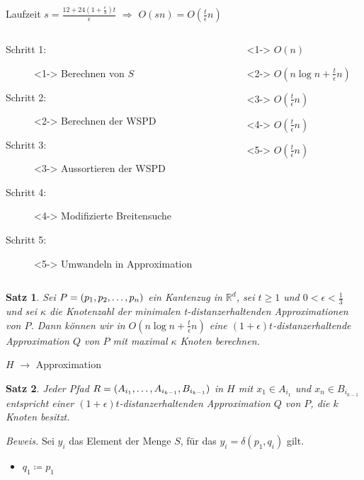 \documentclass{beamer}
\newtheorem{thm}{Satz}
\begin{document}
	\begin{frame}{Laufzeit}
		\centering
		$s = \frac{12 + 24(1 + \frac{\epsilon}{3})t}{\epsilon}$ $\Rightarrow$ $O(sn) = O(\frac{t}{\epsilon}n)$
		\begin{columns}
			\begin{column}{0.6\textwidth}
				\begin{description}
					\item[Schritt 1:]<1-> Berechnen von $S$
					\item[Schritt 2:]<2-> Berechnen der WSPD
					\item[Schritt 3:]<3-> Aussortieren der WSPD
					\item[Schritt 4:]<4-> Modifizierte Breitensuche
					\item[Schritt 5:]<5-> Umwandeln in Approximation
				\end{description}
			\end{column}
			\begin{column}{0.6\textwidth}
				\begin{description}
					\item[]<1-> $O(n)$
					\item[]<2-> $O(n \log n + \frac{t}{\epsilon}n)$
					\item[]<3-> $O(\frac{t}{\epsilon}n)$
					\item[]<4-> $O(\frac{t}{\epsilon}n)$
					\item[]<5-> $O(\frac{t}{\epsilon}n)$
				\end{description}
			\end{column}
		\end{columns}
	\end{frame}
	
	\begin{frame}
		\begin{thm}
		   	Sei $P = (p_1, p_2, \mathellipsis, p_n)$ ein Kantenzug in $\mathbb{R}^d$, sei $t \geq 1$ und $0 < \epsilon < \frac{1}{3}$ und sei $\kappa$ die Knotenzahl der minimalen t-distanzerhaltenden Approximationen von $P$. Dann können wir in $O(n \log n + \frac{t}{\epsilon}n)$ eine $(1 + \epsilon)t$-distanzerhaltende Approximation $Q$ von $P$ mit maximal $\kappa$ Knoten berechnen.
		\end{thm}
	\end{frame}
	
	
	\begin{frame}{$H$ $\rightarrow$ Approximation}
		\begin{thm}
			Jeder Pfad $R = (A_{i_1}, \mathellipsis, A_{i_{k-1}}, B_{i_{k-1}})$ in $H$ mit $x_1 \in A_{i_1}$ und $x_n \in B_{i_{k-1}}$ entspricht einer $(1+\epsilon)t$-distanzerhaltenden Approximation $Q$ von $P$, die $k$ Knoten besitzt.
		\end{thm}
		\textit{Beweis.}
		Sei $y_i$ das Element der Menge $S$, für das $y_i = \delta(p_1, q_i)$ gilt.
		\begin{itemize}
			\item $q_1 \coloneqq p_1$
		\end{itemize}
	\end{frame}
	
\end{document}

